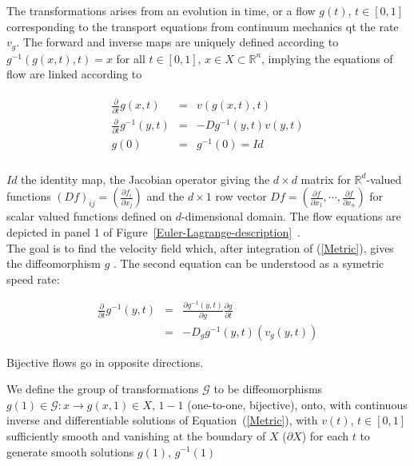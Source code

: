 \documentclass[preprint,review,8pt,times]{elsarticle}
\begin{document}
The transformations arises from an evolution in time, or a flow $g(t)$, $t \in [0, 1]$ corresponding to the transport equations from continuum mechanics qt the rate $v_{g}$. The forward and inverse maps are uniquely defined according to $g^{-1}(g(x, t), t) = x$ for all $t \in [0, 1]$, $x \in X \subset \mathbb{R}^{n}$, implying the equations of flow are linked according to

\begin{eqnarray}
\left .
\begin{array}{rcl}
\frac{\partial}{\partial t}g(x,t) &=& v(g(x,t),t) \\
\frac{\partial}{\partial t}g^{-1}(y,t) &=& -Dg^{-1}(y,t)v(y,t) \\
g(0) &=& g^{-1}(0) = Id \\
\end{array}
\right .
\label{Metric}
\end{eqnarray}

$Id$ the identity map, the Jacobian operator giving the $d \times d$ matrix for $\mathbb{R}^{d}$-valued functions $(Df)_{ij} = (\frac{\partial f_{i}}{\partial x_{j}})$ and the $d \times 1$ row vector $Df = (\frac{\partial f}{\partial x_{1}}, \cdots, \frac{\partial f}{\partial x_{n}} )$ for scalar valued functions defined on $d$-dimensional domain. The flow equations are depicted in panel 1 of Figure~\ref{Euler-Lagrange-description}~\cite{pmid12117763}.\\
The goal is to find the velocity field which, after integration of (\ref{Metric}), gives the diffeomorphism $g$ . The second equation can be understood as a symetric speed rate:

\begin{eqnarray*}
\frac{\partial}{\partial t}g^{-1}(y,t) & = & \frac{\partial g^{-1}(y,t)}{\partial g}\frac{\partial g}{\partial t} \\
& = & - D_{g} g^{-1}(y,t) (v_{g}(y,t))
\end{eqnarray*}

Bijective flows go in opposite directions.

\begin{definition}
We define the group of transformations $\mathcal{G}$ to be diffeomorphisms $g(1) \in \mathcal{G}: x \rightarrow g(x, 1) \in X$, $1-1$ (one-to-one, bijective), onto, with continuous inverse and differentiable solutions of Equation~(\ref{Metric}), with $v(t)$, $t \in [0, 1]$ sufficiently smooth and vanishing at the boundary of $X$ ($\partial X$) for each $t$ to generate smooth solutions $g(1)$, $g^{-1}(1)$
\end{definition}
\end{document}
